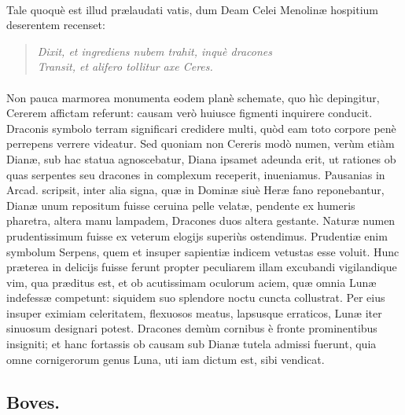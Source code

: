 \documentclass[a4paper, 11pt, oneside, polutonikogreek, latin]{article}
\begin{document}
\paragraph{}
Tale quoquè est illud prælaudati vatis, dum Deam Celei Menolinæ hospitium deserentem recenset:
\begin{quote}
\emph{Dixit, et ingrediens nubem trahit, inquè dracones}\\
\hspace*{10mm}\emph{Transit, et alifero tollitur axe Ceres.}\\
\end{quote}
\vspace*{-8mm}
\paragraph{}
Non pauca marmorea monumenta eodem planè schemate, quo hìc depingitur, Cererem affictam referunt: causam verò huiusce figmenti inquirere conducit. Draconis symbolo terram significari credidere multi, quòd eam toto corpore penè perrepens verrere videatur. Sed quoniam non Cereris modò numen, verùm etiàm Dianæ, sub hac statua agnoscebatur, Diana ipsamet adeunda erit, ut rationes ob quas serpentes seu dracones in complexum receperit, inueniamus. Pausanias in Arcad. scripsit, inter alia signa, quæ in Dominæ siuè Heræ fano reponebantur, Dianæ unum repositum fuisse ceruina pelle velatæ, pendente ex humeris pharetra, altera manu lampadem, Dracones duos altera gestante. Naturæ numen prudentissimum fuisse ex veterum elogijs superiùs ostendimus. Prudentiæ enim symbolum Serpens, quem et insuper sapientiæ indicem vetustas esse voluit. Hunc præterea in delicijs fuisse ferunt propter peculiarem illam excubandi vigilandique vim, qua præditus est, et ob acutissimam oculorum aciem, quæ omnia Lunæ indefessæ competunt: siquidem suo splendore noctu cuncta collustrat. Per eius insuper eximiam celeritatem, flexuosos meatus, lapsusque erraticos, Lunæ iter sinuosum designari potest. Dracones demùm cornibus è fronte prominentibus insigniti; et hanc fortassis ob causam sub Dianæ tutela admissi fuerunt, quia omne cornigerorum genus Luna, uti iam dictum est, sibi vendicat.
\clearpage
\subsection{Boves.}
\end{document}
